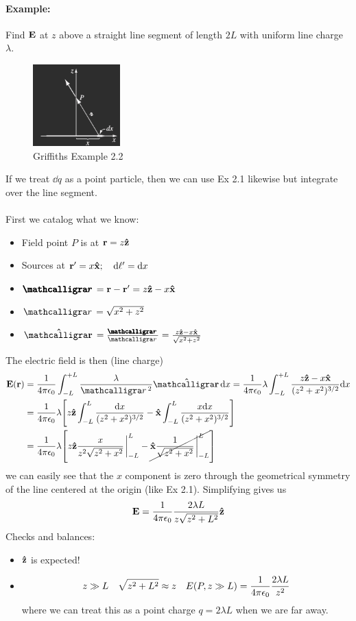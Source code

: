 \documentclass[../main.tex]{subfiles}
\begin{document}
\paragraph*{Example:} Find $\vb E$ at $z$ above a straight line segment of length $2L$ with uniform line charge $\lambda$.
\begin{figure}[ht]
    \centering
    \includegraphics[width=0.3\textwidth]{ex2_2.png}
    \caption{Griffiths Example 2.2}
\end{figure}
If we treat $\dd q$ as a point particle, then we can use Ex 2.1 likewise but integrate over the line segment. 
\paragraph*{}First we catalog what we know:
\begin{itemize}
    \item Field point $P$ is at $\vb r = z \vu z$
    \item Sources at $\vb r' = x \vu x; \quad \dd \ell' = \dd x$
    \item $\boldscriptr = \vb r - \vb r' = z \vu z - x \vu x$
    \item $\scriptr = \sqrt{x^2 + z^2}$
    \item $\vu \scriptr = \frac{\boldscriptr}{\scriptr} = \frac{z \vu z - x \vu x}{\sqrt{x^2 + z^2}}$
\end{itemize}
The electric field is then (line charge)
\begin{align*}
    \vb E(\vb r) &= \ke \int_{-L}^{+L} \frac{\lambda}{\scriptr^2} \vu\scriptr \dd x = \ke \lambda \int_{-L}^{+L} \frac{z \vu z - x \vu x}{(z^2 + x^2)^{3/2}} \dd x \\
    &= \ke \lambda \qt[z\vu z \int_{-L}^L \frac{\dd x}{(z^2 + x^2)^{3/2}} - \vu x \int_{-L}^L \frac{x \dd x}{(z^2 + x^2)^{3/2}}] \\
    &= \ke \lambda \qt[z\vu z \frac{x}{z^2 \sqrt{z^2 + x^2}}\eval_{-L}^L - \cancel{\vu x \frac{1}{\sqrt{z^2 + x^2}}\eval_{-L}^L}] \\
\end{align*}
we can easily see that the $x$ component is zero through the geometrical symmetry of the line centered at the origin (like Ex 2.1). Simplifying gives us
\[\vb E = \frac{1}{4\pi\epsilon_0} \frac{2\lambda L}{z\sqrt{z^2 + L^2}} \vu z\]
Checks and balances:
\begin{itemize}
    \item $\vu z$ is expected!
    \item \[z \gg L \quad \sqrt{z^2 + L^2} \approx z \quad E(P, z\gg L) = \frac{1}{4\pi\epsilon_0} \frac{2\lambda L}{z^2}\]
    where we can treat this as a point charge $q = 2\lambda L$ when we are far away.
\end{itemize}
\end{document}
